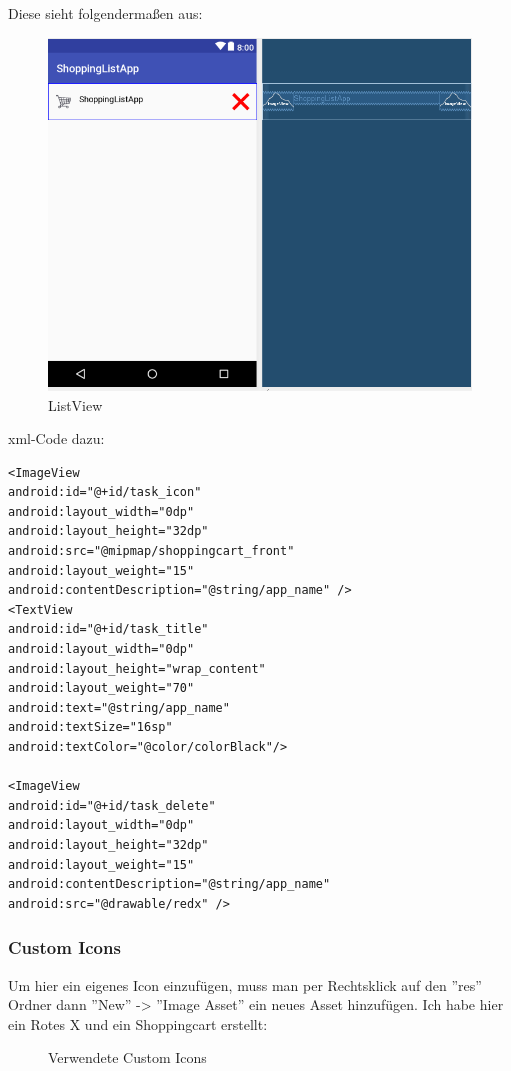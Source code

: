 Diese sieht folgendermaßen aus:
\begin{figure}[!h]
	\centering
	\includegraphics[width=0.6\linewidth]{images/listview}
	\caption{ListView}
	\label{fig:listview}
\end{figure}

xml-Code dazu:
\begin{lstlisting}
<ImageView
android:id="@+id/task_icon"
android:layout_width="0dp"
android:layout_height="32dp"
android:src="@mipmap/shoppingcart_front"
android:layout_weight="15"
android:contentDescription="@string/app_name" />
<TextView
android:id="@+id/task_title"
android:layout_width="0dp"
android:layout_height="wrap_content"
android:layout_weight="70"
android:text="@string/app_name"
android:textSize="16sp"
android:textColor="@color/colorBlack"/>

<ImageView
android:id="@+id/task_delete"
android:layout_width="0dp"
android:layout_height="32dp"
android:layout_weight="15"
android:contentDescription="@string/app_name"
android:src="@drawable/redx" />
\end{lstlisting}

\subsubsection{Custom Icons}
Um hier ein eigenes Icon einzufügen, muss man per Rechtsklick auf den ''res'' Ordner dann ''New'' -> ''Image Asset'' ein neues Asset hinzufügen. Ich habe hier ein Rotes X und ein Shoppingcart erstellt: 

\begin{figure} [!h]
	\caption{Verwendete Custom Icons} 
\end{figure} 

